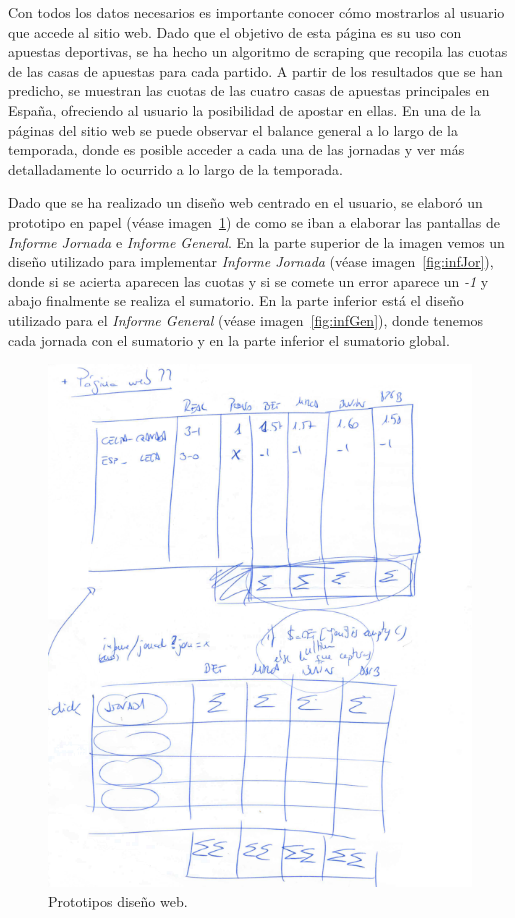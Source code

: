 Con todos los datos necesarios es importante conocer cómo mostrarlos al usuario que accede al sitio web. Dado que el objetivo de esta página es su uso con apuestas deportivas, se ha hecho un algoritmo de scraping que recopila las cuotas de las casas de apuestas para cada partido.
A partir de los resultados que se han predicho, se muestran las cuotas de las cuatro casas de apuestas principales en España, ofreciendo al usuario la posibilidad de apostar en ellas.
En una de la páginas del sitio web se puede observar el balance general a lo largo de la temporada, donde es posible acceder a cada una de las jornadas y ver más detalladamente lo ocurrido a lo largo de la temporada.

Dado que se ha realizado un diseño web centrado en el usuario, se elaboró un prototipo en papel (véase imagen~\ref{fig:prototipo}) de como se iban a elaborar las pantallas de \textit{Informe Jornada} e \textit{Informe General}. 
En la parte superior de la imagen vemos un diseño utilizado para implementar \textit{Informe Jornada} (véase imagen~\ref{fig:infJor}), donde si se acierta aparecen las cuotas y si se comete un error aparece un \textit{-1} y abajo finalmente se realiza el sumatorio.
En la parte inferior está el diseño utilizado para el \textit{Informe General} (véase imagen~\ref{fig:infGen}), donde tenemos cada jornada con el sumatorio y en la parte inferior el sumatorio global.

\begin{figure}
\centering
\includegraphics[width=.9\textwidth]{img/prototipo}
\caption{Prototipos diseño web.}
\label{fig:prototipo}
\end{figure}

